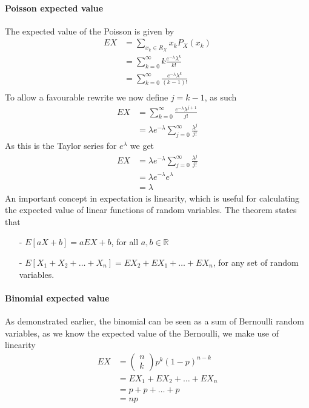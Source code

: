 \paragraph{Poisson expected value}
The expected value of the Poisson is given by
\begin{align*}
    EX&=\sum_{x_{k}\in R_{X}}x_{k}P_{X}(x_{k}) \\
      &=\sum_{k=0}^{\infty}k\frac{e^{-\lambda}\lambda^{k}}{k!} \\
      &=\sum_{k=0}^{\infty}\frac{e^{-\lambda}\lambda^{k}}{(k-1)!} \\
\end{align*}
To allow a favourable rewrite we now define $j=k-1$, as such
\begin{align*}
    EX&=\sum_{k=0}^{\infty}\frac{e^{-\lambda}\lambda^{j+1}}{j!} \\
      &=\lambda e^{-\lambda}\sum_{j=0}^{\infty}\frac{\lambda^{j}}{j!}
\end{align*}
As this is the Taylor series for $e^{\lambda}$ we get
\begin{align*}
    EX&=\lambda e^{-\lambda}\sum_{j=0}^{\infty}\frac{\lambda^{j}}{j!} \\
      &=\lambda e^{-\lambda}e^{\lambda} \\
      &=\lambda
\end{align*}
An important concept in expectation is linearity, which is useful for calculating the expected value of linear functions of random variables. The theorem states that
\begin{itemize}
    \item[-] $E[aX+b]=aEX+b$, for all $a,b\in\mathbb{R}$
    \item[-] $E[X_{1}+X_{2}+\ldots+X_{n}]=EX_{2}+EX_{1}+\ldots+EX_{n}$, for any set of random variables.
\end{itemize}
\paragraph{Binomial expected value}
As demonstrated earlier, the binomial can be seen as a sum of Bernoulli random variables, as we know the expected value of the Bernoulli, we make use of linearity
\begin{align*}
    EX&=\begin{pmatrix}n\\k\end{pmatrix}p^{k}(1-p)^{n-k} \\
      &=EX_{1}+EX_{2}+\ldots+EX_{n} \\
      &=p+p+\ldots+p \\
      &=np
\end{align*}
